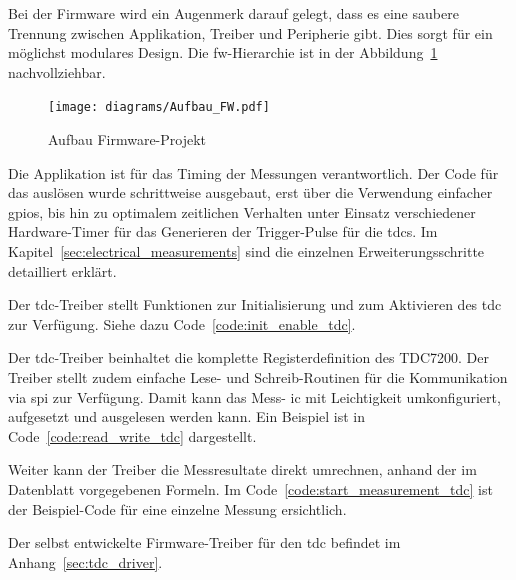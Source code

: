 Bei der Firmware wird ein Augenmerk darauf gelegt, dass es eine saubere Trennung zwischen Applikation, Treiber und
Peripherie gibt. Dies sorgt für ein möglichst modulares Design. Die \acrshort{fw}-Hierarchie ist in der
Abbildung~\ref{fig:hierarchy_firmware} nachvollziehbar.

\begin{figure}[H]
    \centering
    \texttt{[image: diagrams/Aufbau\_FW.pdf]}
    \caption{Aufbau Firmware-Projekt}\label{fig:hierarchy_firmware}
\end{figure}

Die Applikation ist für das Timing der Messungen verantwortlich. Der Code für das auslösen wurde schrittweise ausgebaut,
erst über die Verwendung einfacher \acrshort{gpio}s, bis hin zu optimalem zeitlichen Verhalten unter Einsatz verschiedener
Hardware-Timer für das Generieren der Trigger-Pulse für die \acrshort{tdc}s. Im Kapitel~\ref{sec:electrical_measurements}
sind die einzelnen Erweiterungsschritte detailliert erklärt.

Der \acrshort{tdc}-Treiber stellt Funktionen zur Initialisierung und zum Aktivieren des \acrshort{tdc} zur Verfügung.
Siehe dazu Code~\ref{code:init_enable_tdc}.



Der \acrshort{tdc}-Treiber beinhaltet die komplette Registerdefinition des TDC7200. Der Treiber stellt zudem einfache
Lese- und Schreib-Routinen für die Kommunikation via \acrshort{spi} zur Verfügung. Damit kann das Mess- \acrshort{ic}
mit Leichtigkeit umkonfiguriert, aufgesetzt und ausgelesen werden kann. Ein Beispiel ist in
Code~\ref{code:read_write_tdc} dargestellt.



Weiter kann der Treiber die Messresultate direkt umrechnen, anhand der im Datenblatt vorgegebenen
Formeln. Im Code~\ref{code:start_measurement_tdc} ist der Beispiel-Code für eine einzelne Messung ersichtlich.



Der selbst entwickelte Firmware-Treiber für den \acrshort{tdc} befindet im Anhang~\ref{sec:tdc_driver}.

